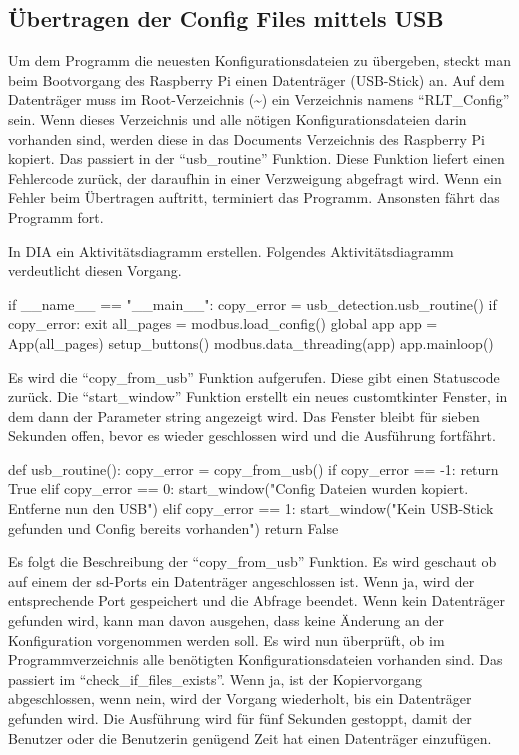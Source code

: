 \subsection{Übertragen der Config Files mittels USB}
Um dem Programm die neuesten Konfigurationsdateien zu übergeben, steckt man beim Bootvorgang des Raspberry Pi einen Datenträger (\zB USB-Stick) an. Auf dem Datenträger muss im Root-Verzeichnis (\textasciitilde) ein Verzeichnis namens \enquote{RLT\_Config} sein. Wenn dieses Verzeichnis und alle nötigen Konfigurationsdateien darin vorhanden sind, werden diese in das Documents Verzeichnis des Raspberry Pi kopiert. Das passiert in der \enquote{usb\_routine} Funktion. Diese Funktion liefert einen Fehlercode zurück, der daraufhin in einer Verzweigung abgefragt wird. Wenn ein Fehler beim Übertragen auftritt, terminiert das Programm. Ansonsten fährt das Programm fort.

In DIA ein Aktivitätsdiagramm erstellen.
Folgendes Aktivitätsdiagramm verdeutlicht diesen Vorgang.


\begin{pythoncode}
if __name__ == "__main__":
	copy_error = usb_detection.usb_routine()
	if copy_error:
		exit
	all_pages = modbus.load_config()
	global app
	app = App(all_pages)
	setup_buttons()
	modbus.data_threading(app)
	app.mainloop()	
\end{pythoncode}

Es wird die \enquote{copy\_from\_usb} Funktion aufgerufen. Diese gibt einen Statuscode zurück. Die \enquote{start\_window} Funktion erstellt ein neues customtkinter Fenster, in dem dann der Parameter string angezeigt wird. Das Fenster bleibt für sieben Sekunden offen, bevor es wieder geschlossen wird und die Ausführung fortfährt.

\begin{pythoncode}
def usb_routine():
	copy_error = copy_from_usb()
	if copy_error == -1:
		return True
	elif copy_error == 0:
		start_window("Config Dateien wurden kopiert. Entferne nun den USB")   
	elif copy_error == 1: 
		start_window("Kein USB-Stick gefunden und Config bereits vorhanden")  
	return False
\end{pythoncode}

Es folgt die Beschreibung der \enquote{copy\_from\_usb} Funktion. Es wird geschaut ob auf einem der sd-Ports ein Datenträger angeschlossen ist. Wenn ja, wird der entsprechende Port gespeichert und die Abfrage beendet. Wenn kein Datenträger gefunden wird, kann man davon ausgehen, dass keine Änderung an der Konfiguration vorgenommen werden soll. Es wird nun überprüft, ob im Programmverzeichnis alle benötigten Konfigurationsdateien vorhanden sind. Das passiert im \enquote{check\_if\_files\_exists}. Wenn ja, ist der Kopiervorgang abgeschlossen, wenn nein, wird der Vorgang wiederholt, bis ein Datenträger gefunden wird. Die Ausführung wird für fünf Sekunden gestoppt, damit der Benutzer oder die Benutzerin genügend Zeit hat einen Datenträger einzufügen.

